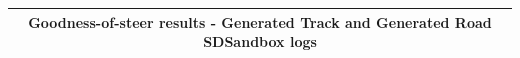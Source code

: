 \begin{table}[]
\begin{center}
\begin{tabular}{|l|l|l|l|l|l|}
\hline
\multicolumn{6}{|c|}{Goodness-of-steer results - Generated Track and Generated Road SDSandbox logs} \\ \hline




\end{tabular}
\end{center}
\end{table}
